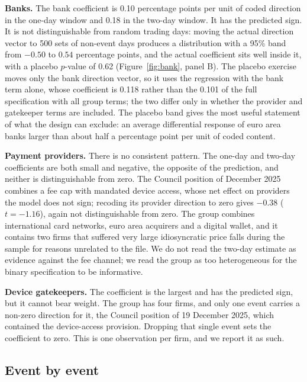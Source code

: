 \documentclass[11pt]{article}
\theoremstyle{plain}\newtheorem{proposition}{Proposition}
\begin{document}
\textbf{Banks.} The bank coefficient is 0.10 percentage points per unit of coded direction in the one-day window and 0.18 in the two-day window. It has the predicted sign. It is not distinguishable from random trading days: moving the actual direction vector to 500 sets of non-event days produces a distribution with a 95\% band from $-0.50$ to $0.54$ percentage points, and the actual coefficient sits well inside it, with a placebo $p$-value of 0.62 (Figure~\ref{fig:bank}, panel B). The placebo exercise moves only the bank direction vector, so it uses the regression with the bank term alone, whose coefficient is 0.118 rather than the 0.101 of the full specification with all group terms; the two differ only in whether the provider and gatekeeper terms are included. The placebo band gives the most useful statement of what the design can exclude: an average differential response of euro area banks larger than about half a percentage point per unit of coded content.

\textbf{Payment providers.} There is no consistent pattern. The one-day and two-day coefficients are both small and negative, the opposite of the prediction, and neither is distinguishable from zero. The Council position of December 2025 combines a fee cap with mandated device access, whose net effect on providers the model does not sign; recoding its provider direction to zero gives $-0.38$ ($t = -1.16$), again not distinguishable from zero. The group combines international card networks, euro area acquirers and a digital wallet, and it contains two firms that suffered very large idiosyncratic price falls during the sample for reasons unrelated to the file. We do not read the two-day estimate as evidence against the fee channel; we read the group as too heterogeneous for the binary specification to be informative.

\textbf{Device gatekeepers.} The coefficient is the largest and has the predicted sign, but it cannot bear weight. The group has four firms, and only one event carries a non-zero direction for it, the Council position of 19 December 2025, which contained the device-access provision. Dropping that single event sets the coefficient to zero. This is one observation per firm, and we report it as such.

\subsection{Event by event}
\end{document}
